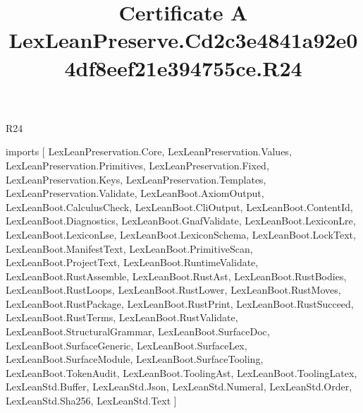 \begin{lexlean}{R24}
\title{Certificate A LexLeanPreserve.Cd2c3e4841a92e04df8eef21e394755ce.R24}
\begin{coremodule}
imports [
  LexLeanPreservation.Core,
  LexLeanPreservation.Values,
  LexLeanPreservation.Primitives,
  LexLeanPreservation.Fixed,
  LexLeanPreservation.Keys,
  LexLeanPreservation.Templates,
  LexLeanPreservation.Validate,
  LexLeanBoot.AxiomOutput,
  LexLeanBoot.CalculusCheck,
  LexLeanBoot.CliOutput,
  LexLeanBoot.ContentId,
  LexLeanBoot.Diagnostics,
  LexLeanBoot.GnafValidate,
  LexLeanBoot.LexiconLre,
  LexLeanBoot.LexiconLse,
  LexLeanBoot.LexiconSchema,
  LexLeanBoot.LockText,
  LexLeanBoot.ManifestText,
  LexLeanBoot.PrimitiveScan,
  LexLeanBoot.ProjectText,
  LexLeanBoot.RuntimeValidate,
  LexLeanBoot.RustAssemble,
  LexLeanBoot.RustAst,
  LexLeanBoot.RustBodies,
  LexLeanBoot.RustLoops,
  LexLeanBoot.RustLower,
  LexLeanBoot.RustMoves,
  LexLeanBoot.RustPackage,
  LexLeanBoot.RustPrint,
  LexLeanBoot.RustSucceed,
  LexLeanBoot.RustTerms,
  LexLeanBoot.RustValidate,
  LexLeanBoot.StructuralGrammar,
  LexLeanBoot.SurfaceDoc,
  LexLeanBoot.SurfaceGeneric,
  LexLeanBoot.SurfaceLex,
  LexLeanBoot.SurfaceModule,
  LexLeanBoot.SurfaceTooling,
  LexLeanBoot.TokenAudit,
  LexLeanBoot.ToolingAst,
  LexLeanBoot.ToolingLatex,
  LexLeanStd.Buffer,
  LexLeanStd.Json,
  LexLeanStd.Numeral,
  LexLeanStd.Order,
  LexLeanStd.Sha256,
  LexLeanStd.Text
]


\end{coremodule}
\end{lexlean}
